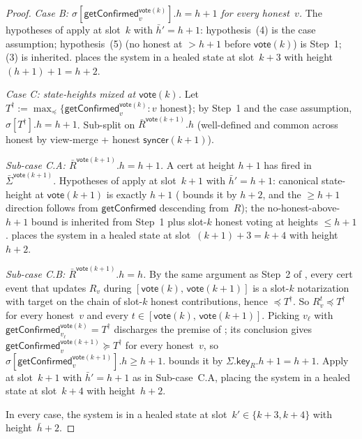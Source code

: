 \ifx\litemode\undefined\documentclass{article}\fi
\newcommand{\key}{\mathsf{key}}
\newcommand{\syncer}{\mathsf{syncer}}
\newcommand{\vote}{\mathsf{vote}}
\newcommand{\comm}[1]{\bar{#1}}
\newcommand{\getConfirmed}{\textsf{getConfirmed}\xspace}
\theoremstyle{plain}
\theoremstyle{definition}
\theoremstyle{remark}
\begin{document}
\begin{proof}
\emph{Case B: $\sigma[\getConfirmed_v^{\vote(k)}].h = h+1$ for every honest~$v$.}
The hypotheses of  apply at slot~$k$ with $\comm{h}' = h+1$: hypothesis~(4) is the case assumption; hypothesis~(5) (no honest at $> h+1$ before $\vote(k)$) is Step~1; (3) is inherited.  places the system in a healed state at slot~$k+3$ with height~$(h+1)+1 = h+2$.

\emph{Case C: state-heights mixed at $\vote(k)$.}
Let $T^\dagger := \max_\preceq \{\getConfirmed_v^{\vote(k)} : v \text{ honest}\}$; by Step~1 and the case assumption, $\sigma[T^\dagger].h = h+1$. Sub-split on $\comm{R}^{\vote(k+1)}.h$ (well-defined and common across honest by view-merge + honest $\syncer(k+1)$).

\emph{Sub-case C.A: $\comm{R}^{\vote(k+1)}.h = h+1$.}
A cert at height $h+1$ has fired in $\comm{\Sigma}^{\vote(k+1)}$. Hypotheses of  apply at slot~$k+1$ with $\comm{h}' = h+1$: canonical state-height at $\vote(k+1)$ is exactly $h+1$ ( bounds it by $h+2$, and the $\geq h+1$ direction follows from $\getConfirmed$ descending from~$R$); the no-honest-above-$h+1$ bound is inherited from Step~1 plus slot-$k$ honest voting at heights $\leq h+1$.  places the system in a healed state at slot~$(k+1)+3 = k+4$ with height~$h+2$.

\emph{Sub-case C.B: $\comm{R}^{\vote(k+1)}.h = h$.}
By the same argument as Step~2 of , every cert event that updates $R_v$ during $[\vote(k),\, \vote(k+1)]$ is a slot-$k$ notarization with target on the chain of slot-$k$ honest contributions, hence $\preceq T^\dagger$. So $R_v^t \preceq T^\dagger$ for every honest~$v$ and every $t \in [\vote(k),\, \vote(k+1)]$. Picking $v_\ell$ with $\getConfirmed_{v_\ell}^{\vote(k)} = T^\dagger$ discharges the premise of ; its conclusion gives $\getConfirmed_v^{\vote(k+1)} \succeq T^\dagger$ for every honest~$v$, so $\sigma[\getConfirmed_v^{\vote(k+1)}].h \geq h+1$.  bounds it by $\Sigma.\key_R.h + 1 = h+1$. Apply  at slot~$k+1$ with $\comm{h}' = h+1$ as in Sub-case~C.A, placing the system in a healed state at slot~$k+4$ with height~$h+2$.

In every case, the system is in a healed state at slot~$k' \in \{k+3, k+4\}$ with height~$\comm{h}+2$.
\end{proof}
\end{document}
